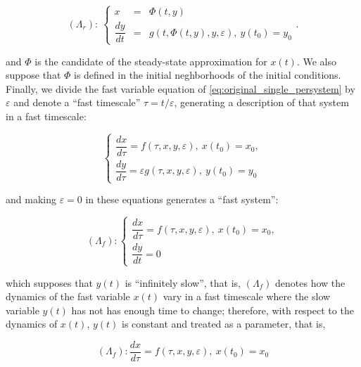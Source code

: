 \begin{equation}\left(\Lambda_{r}\right):\ \left\{\begin{array}{rcl} x &=& \Phi\left(t,y\right) \\[3mm] \dfrac{dy}{dt} &=& g\left(t,\Phi\left(t,y\right),y,\varepsilon\right),\ y\left(t_0\right) = y_0 \end{array}\right. .\end{equation}

	\noindent and $\Phi$ is the candidate of the steady-state approximation for $x(t)$. We also suppose that $\Phi$ is defined in the initial neghborhoods of the initial conditions. Finally, we divide the fast variable equation of \eqref{eq:original_single_persystem} by $\varepsilon$ and denote a ``fast timescale'' $\tau = t/\varepsilon$, generating a description of that system in a fast timescale:

\begin{equation}\left\{\begin{array}{l} \dfrac{dx}{d\tau} = f\left(\tau,x,y,\varepsilon\right),\ x\left(t_0\right) = x_0, \\[3mm]\dfrac{dy}{d\tau} = \varepsilon g\left(\tau,x,y,\varepsilon\right),\ y\left(t_0\right) = y_0 \end{array}\right. \end{equation}

	\noindent and making $\varepsilon = 0$ in these equations generates a ``fast system'':

\begin{equation}\left(\Lambda_f\right): \left\{\begin{array}{l} \dfrac{dx}{d\tau} = f\left(\tau,x,y,\varepsilon\right),\ x\left(t_0\right) = x_0, \\[3mm]\dfrac{dy}{dt} = 0 \end{array}\right. \end{equation}

	\noindent which supposes that $y(t)$ is ``infinitely slow'', that is, $\left(\Lambda_f\right)$ denotes how the dynamics of the fast variable $x(t)$ vary in a fast timescale where the slow variable $y(t)$ has not has enough time to change; therefore, with respect to the dynamics of $x(t)$, $y(t)$ is constant and treated as a parameter, that is,

\begin{equation}\left(\Lambda_f\right): \dfrac{dx}{d\tau} = f\left(\tau,x,y,\varepsilon\right),\ x\left(t_0\right) = x_0 \end{equation}

